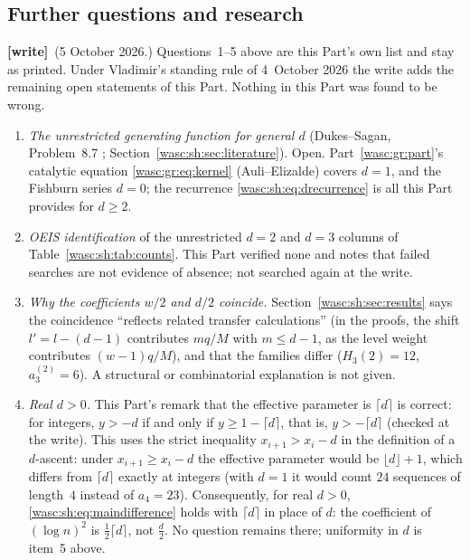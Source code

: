 \documentclass[11pt,a4paper]{article}
\theoremstyle{remark}\newtheorem{remark}[theorem]{Remark}
\numberwithin{equation}{section}
\newcommand{\wtag}{\textup{\textbf{[write]}}}
\begin{document}
\subsection{Further questions and research}\label{wasc:sh:sub:further}
\wtag\ (5 October 2026.) Questions~1--5 above are this Part's own list and stay as printed. Under Vladimir's standing rule of 4~October 2026 the write adds the remaining open statements of this Part. Nothing in this Part was found to be wrong.
\begin{enumerate}[leftmargin=*,itemsep=3pt,start=6]
\item \emph{The unrestricted generating function for general $d$} (Dukes--Sagan, Problem~8.7 \cite{dukes}; Section~\ref{wasc:sh:sec:literature}). Open. Part~\ref{wasc:gr:part}'s catalytic equation \eqref{wasc:gr:eq:kernel} (Auli--Elizalde) covers $d=1$, and the Fishburn series $d=0$; the recurrence \eqref{wasc:sh:eq:drecurrence} is all this Part provides for $d\ge2$.
\item \emph{OEIS identification} of the unrestricted $d=2$ and $d=3$ columns of Table~\ref{wasc:sh:tab:counts}. This Part verified none and notes that failed searches are not evidence of absence; not searched again at the write.
\item \emph{Why the coefficients $w/2$ and $d/2$ coincide.} Section~\ref{wasc:sh:sec:results} says the coincidence ``reflects related transfer calculations'' (in the proofs, the shift $l'=l-(d-1)$ contributes $mq/M$ with $m\le d-1$, as the level weight contributes $(w-1)q/M$), and that the families differ ($H_3(2)=12$, $a_3^{(2)}=6$). A structural or combinatorial explanation is not given.
\item \emph{Real $d>0$.} This Part's remark that the effective parameter is $\lceil d\rceil$ is correct: for integers, $y>-d$ if and only if $y\ge1-\lceil d\rceil$, that is, $y>-\lceil d\rceil$ (checked at the write). This uses the strict inequality $x_{i+1}>x_i-d$ in the definition of a $d$-ascent: under $x_{i+1}\ge x_i-d$ the effective parameter would be $\lfloor d\rfloor+1$, which differs from $\lceil d\rceil$ exactly at integers (with $d=1$ it would count $24$ sequences of length~$4$ instead of $a_4=23$). Consequently, for real $d>0$, \eqref{wasc:sh:eq:maindifference} holds with $\lceil d\rceil$ in place of $d$: the coefficient of $(\log n)^2$ is $\frac12\lceil d\rceil$, not $\frac d2$. No question remains there; uniformity in $d$ is item~5 above.
\end{enumerate}
\end{document}
